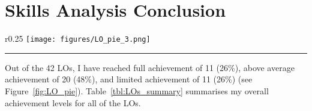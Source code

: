 
\section{Skills Analysis Conclusion} \label{sec:skills_ccl}


\begin{wrapfigure}[6]{r}{0.25\textwidth}
	\centering
	\texttt{[image: figures/LO\_pie\_3.png]}
	\rule{0.25\textwidth}{0.5pt} %
	\caption{My achievement of the 42 LOs.}
	\label{fig:LO_pie}
\end{wrapfigure}

Out of the 42 LOs, I have reached full achievement of 11 (26\%), above average achievement of 20 (48\%), and limited achievement of 11 (26\%) (see Figure~\ref{fig:LO_pie}).
Table~\ref{tbl:LOs_summary} summarises my overall achievement levels for all of the LOs.


